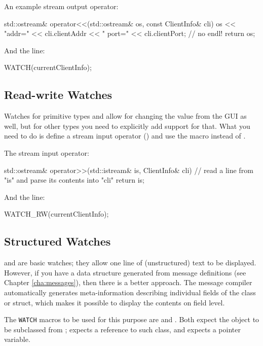 An example stream output operator:

\begin{cpp}
std::ostream& operator<<(std::ostream& os, const ClientInfo& cli)
{
    os << "addr=" << cli.clientAddr << "  port=" << cli.clientPort; // no endl!
    return os;
}
\end{cpp}

And the  line:

\begin{cpp}
WATCH(currentClientInfo);
\end{cpp}


\subsection{Read-write Watches}
\label{sec:sim-lib:read-write-watches}

Watches for primitive types and  allow for changing
the value from the GUI as well, but for other types you need to explicitly
add support for that. What you need to do is define a stream input
operator () and use the  macro instead of
.

The stream input operator:

\begin{cpp}
std::ostream& operator>>(std::istream& is, ClientInfo& cli)
{
    // read a line from "is" and parse its contents into "cli"
    return is;
}
\end{cpp}

And the  line:

\begin{cpp}
WATCH_RW(currentClientInfo);
\end{cpp}


\subsection{Structured Watches}
\label{sec:sim-lib:structured-watches}

 and  are basic watches; they allow one
line of (unstructured) text to be displayed. However, if you have a
data structure generated from message definitions (see Chapter \ref{cha:messages}),
then there is a better approach. The message compiler automatically generates
meta-information describing individual fields of the class or struct,
which makes it possible to display the contents on field level.

The \texttt{WATCH} macros to be used for this purpose are 
and . Both expect the object to be subclassed from
;  expects a reference to such class,
and  expects a pointer variable.

